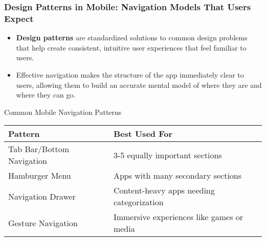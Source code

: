 \documentclass{beamer}
\begin{document}
	\begin{frame}
		\frametitle{Design Patterns in Mobile: Navigation Models That Users Expect}
		
		\begin{itemize}
			\item \textbf{Design patterns} are standardized solutions to common design problems that help create consistent, intuitive user experiences that feel familiar to users.
			\item Effective navigation makes the structure of the app immediately clear to users, allowing them to build an accurate mental model of where they are and where they can go.
		\end{itemize}
		
		\begin{block}{\scriptsize{Common Mobile Navigation Patterns}}
			\scriptsize{
				\begin{tabular}{|p{2.5cm}|p{4.5cm}|}
					\hline
					\textbf{Pattern} & \textbf{Best Used For} \\
					\hline
					Tab Bar/Bottom Navigation & 3-5 equally important sections \\
					\hline
					Hamburger Menu & Apps with many secondary sections \\
					\hline 
					Navigation Drawer & Content-heavy apps needing categorization \\
					\hline
					Gesture Navigation & Immersive experiences like games or media \\
					\hline
				\end{tabular}
			}
		\end{block}
		
	\end{frame}
	
\end{document}
